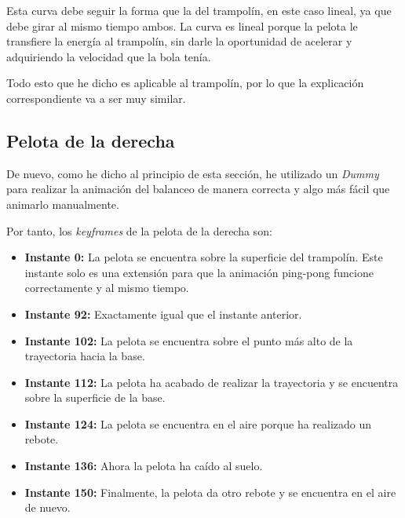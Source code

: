 
Esta curva debe seguir la forma que la del trampolín, en este caso lineal, ya que debe girar al mismo tiempo ambos. La curva es lineal porque la pelota le transfiere la energía al trampolín, sin darle la oportunidad de acelerar y adquiriendo la velocidad que la bola tenía.

\bigskip

Todo esto que he dicho es aplicable al trampolín, por lo que la explicación correspondiente va a ser muy similar.

\bigskip




\subsection{Pelota de la derecha}
De nuevo, como he dicho al principio de esta sección, he utilizado un \textit{Dummy} para realizar la animación del balanceo de manera correcta y algo más fácil que animarlo manualmente.

\bigskip

Por tanto, los \textit{keyframes} de la pelota de la derecha son:

\begin{itemize}
    \item \textbf{Instante 0: }La pelota se encuentra sobre la superficie del trampolín. Este instante solo es una extensión para que la animación ping-pong funcione correctamente y al mismo tiempo.
    \item \textbf{Instante 92: }Exactamente igual que el instante anterior.
    \item \textbf{Instante 102: }La pelota se encuentra sobre el punto más alto de la trayectoria hacia la base.
    \item \textbf{Instante 112: }La pelota ha acabado de realizar la trayectoria y se encuentra sobre la superficie de la base.
    \item \textbf{Instante 124: }La pelota se encuentra en el aire porque ha realizado un rebote.
    \item \textbf{Instante 136: }Ahora la pelota ha caído al suelo.
    \item \textbf{Instante 150: }Finalmente, la pelota da otro rebote y se encuentra en el aire de nuevo.
\end{itemize}

